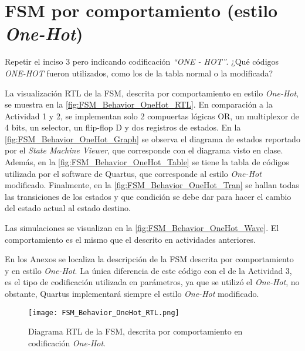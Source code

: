 \section{FSM por comportamiento (estilo \textit{One-Hot}) \label{sec:s4}}

\begin{center}
	\begin{minipage}{12cm}
		\begin{tcolorbox}[title=Actividad 4]
			Repetir el inciso 3 pero indicando codificación \textit{``ONE - HOT''}. ¿Qué códigos \textit{ONE-HOT} fueron utilizados, como los de la tabla normal o la modificada?
		\end{tcolorbox}	
	\end{minipage}
\end{center}

La visualización RTL de la FSM, descrita por comportamiento en estilo \textit{One-Hot}, se muestra en la \autoref{fig:FSM_Behavior_OneHot_RTL}. En comparación a la Actividad 1 y 2, se implementan solo 2 compuertas lógicas OR, un multiplexor de 4 bits, un selector, un flip-flop D y dos registros de estados. En la \autoref{fig:FSM_Behavior_OneHot_Graph} se observa el diagrama de estados reportado por el \textit{State Machine Viewer}, que corresponde con el diagrama visto en clase. Además, en la \autoref{fig:FSM_Behavior_OneHot_Table} se tiene la tabla de códigos utilizada por el software de Quartus, que corresponde al estilo \textit{One-Hot} modificado. Finalmente, en la \autoref{fig:FSM_Behavior_OneHot_Tran} se hallan todas las transiciones de los estados y que condición se debe dar para hacer el cambio del estado actual al estado destino.

Las simulaciones se visualizan en la \autoref{fig:FSM_Behavior_OneHot_Wave}. El comportamiento es el mismo que el descrito en actividades anteriores.

En los Anexos se localiza la descripción de la FSM descrita por comportamiento y en estilo \textit{One-Hot}. La única diferencia de este código con el de la Actividad 3, es el tipo de codificación utilizada en parámetros, ya que se utilizó el \textit{One-Hot}, no obstante, Quartus implementará siempre el estilo \textit{One-Hot} modificado.

\begin{figure}[ht]
	\centering
	\texttt{[image: FSM\_Behavior\_OneHot\_RTL.png]}
	\caption{Diagrama RTL de la FSM, descrita por comportamiento en codificación \textit{One-Hot}. \label{fig:FSM_Behavior_OneHot_RTL}}
\end{figure}

